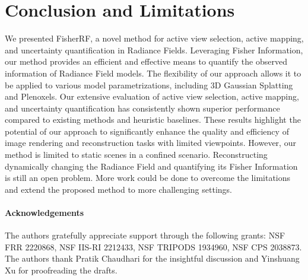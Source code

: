 \vspace{-3mm}
\section{Conclusion and Limitations} \label{sec:conclusion}
\vspace{-2mm}
We presented FisherRF, a novel method for active view selection, active mapping, and uncertainty quantification in Radiance Fields. 
Leveraging Fisher Information, our method provides an efficient and effective means to quantify the observed information of Radiance Field models. The flexibility of our approach allows it to be applied to various model parametrizations, including 3D Gaussian Splatting and Plenoxels.
Our extensive evaluation of active view selection, active mapping, and uncertainty quantification has consistently shown superior performance compared to existing methods and heuristic baselines. These results highlight the potential of our approach to significantly enhance the quality and efficiency of image rendering and reconstruction tasks with limited viewpoints.
However, our method is limited to static scenes in a confined scenario. Reconstructing dynamically changing the Radiance Field and quantifying its Fisher Information is still an open problem.
More work could be done to overcome the limitations and extend the proposed method to more challenging settings. 

{\small
\paragraph{Acknowledgements}
The authors gratefully appreciate support through the following grants: NSF FRR 2220868, NSF IIS-RI 2212433, NSF TRIPODS 1934960, NSF CPS 2038873.
The authors thank Pratik Chaudhari for the insightful discussion and Yinshuang Xu for proofreading the drafts.
}

